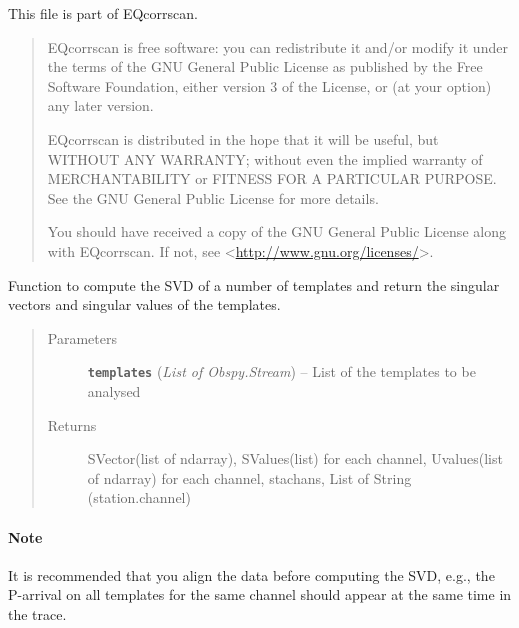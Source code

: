 \documentclass[a4paper,10pt,english]{sphinxmanual}
\begin{document}
This file is part of EQcorrscan.
\begin{quote}

EQcorrscan is free software: you can redistribute it and/or modify
it under the terms of the GNU General Public License as published by
the Free Software Foundation, either version 3 of the License, or
(at your option) any later version.

EQcorrscan is distributed in the hope that it will be useful,
but WITHOUT ANY WARRANTY; without even the implied warranty of
MERCHANTABILITY or FITNESS FOR A PARTICULAR PURPOSE.  See the
GNU General Public License for more details.

You should have received a copy of the GNU General Public License
along with EQcorrscan.  If not, see \textless{}\href{http://www.gnu.org/licenses/}{http://www.gnu.org/licenses/}\textgreater{}.
\end{quote}

\begin{fulllineitems}
\label{utils:clustering.SVD}
Function to compute the SVD of a number of templates and return the singular
vectors and singular values of the templates.
\begin{quote}\begin{description}
\item[{Parameters}] \leavevmode
\textbf{\texttt{templates}} (\emph{List of Obspy.Stream}) -- List of the templates to be analysed

\item[{Returns}] \leavevmode
SVector(list of ndarray), SValues(list) for each channel,             Uvalues(list of ndarray) for each channel,             stachans, List of String (station.channel)

\end{description}\end{quote}
\paragraph{Note}

It is recommended that you align the data before computing the SVD, e.g.,
the P-arrival on all templates for the same channel should appear at the same
time in the trace.

\end{fulllineitems}

\end{document}
